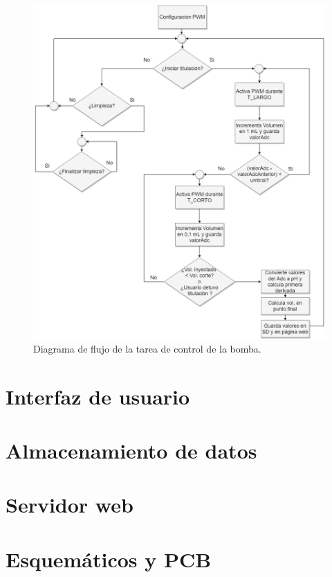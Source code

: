 \begin{figure}[htbp]
	\centering
	\includegraphics[width=1.0\textwidth]{./Figures/motorBomba.png}
	\caption{Diagrama de flujo de la tarea de control de la bomba.}
	\label{fig:flujoBomba}
\end{figure}


\section{Interfaz de usuario}

\section{Almacenamiento de datos}

\section{Servidor web}

\section{Esquemáticos y PCB}
